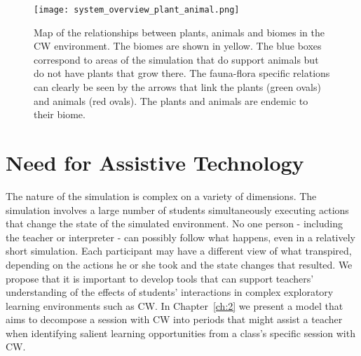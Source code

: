 \begin{figure}
\centering
\texttt{[image: system\_overview\_plant\_animal.png]}
\caption{Map of the relationships between plants, animals and biomes in the CW environment. The biomes are shown in yellow. The blue boxes correspond to areas of the simulation that do support animals but do not have plants that grow there. The fauna-flora specific relations can clearly be seen by the arrows that link the plants (green ovals) and animals (red ovals). The plants and animals are endemic to their biome.}
\label{fig:system_overview_plant_animal}
\end{figure}

\section{Need for Assistive Technology}\label{sec:need_for_assistive_tech}
The nature of the simulation is complex on a variety of dimensions. The simulation involves a large number of students simultaneously executing actions that change the state of the simulated environment.  No one person - including the teacher or interpreter - can possibly follow what happens, even in a relatively short simulation. Each participant may have a different view of what transpired, depending on the actions he or she took and the state changes that resulted. We propose that it is important to develop tools that can support teachers' understanding of the effects of students' interactions in complex exploratory learning environments such as CW. In Chapter~\ref{ch:2} we present a model that aims to decompose a session with CW into periods that might assist a teacher when identifying salient learning opportunities from a class's specific session with CW.
